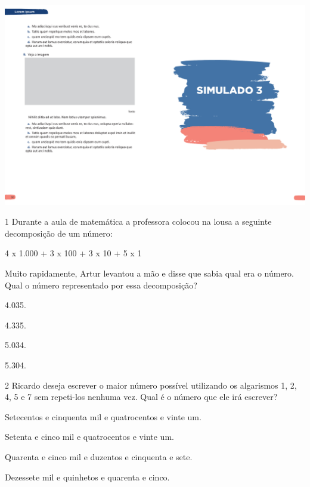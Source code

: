 \vspace*{-3.4cm}
\hspace*{-3.7cm}\includegraphics[scale=1]{../watermarks/3simulado5ano.pdf}

\num{1} Durante a aula de matemática a professora colocou na lousa a seguinte decomposição de um número:

\begin{myquote}
4 x 1.000 + 3 x 100 + 3 x 10 + 5 x 1
\end{myquote}

Muito rapidamente, Artur levantou a mão e disse que sabia qual era o número. Qual o número representado por essa decomposição?

\begin{escolha}
\item
  4.035.
\item
  4.335.
\item
  5.034.
\item
  5.304.
\end{escolha}

\num{2} Ricardo deseja escrever o maior número possível utilizando os algarismos 1, 2, 4, 5 e 7 sem repeti-los nenhuma vez. Qual é o número que ele irá escrever?

\begin{escolha}
\item
  Setecentos e cinquenta mil e quatrocentos e vinte um.
\item
  Setenta e cinco mil e quatrocentos e vinte um.
\item
  Quarenta e cinco mil e duzentos e cinquenta e sete.
\item
  Dezessete mil e quinhetos e quarenta e cinco.
\end{escolha}


